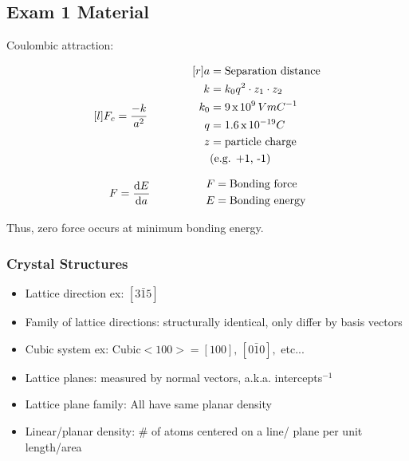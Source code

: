 \documentclass{equation-sheet}
\begin{document}
\subsection{Exam 1 Material}

Coulombic attraction:

\begin{equation*}
	\begin{aligned}[l]
		F_c &= \frac{-k}{a^2} \\
	\end{aligned} 
	\qquad \qquad
	\begin{aligned}[r]
	    a &= \text{Separation distance} \\
		k &= k_0 q^2 \cdot z_1 \cdot z_2 \\
		k_0 &= \scinote{9}{9} \, V m C^{-1} \\
		q &= \scinote{1.6}{-19} C \\
		z &= \text{particle charge} \\
		& \text{(e.g. +1, -1)}
	\end{aligned}
\end{equation*}

\begin{equation*}
    \begin{aligned}
        F &= \dfrac{\mathrm{d}E}{\mathrm{d}a}
    \end{aligned}
    \qquad \qquad
    \begin{aligned}
        F &= \text{Bonding force} \\
        E &= \text{Bonding energy}
    \end{aligned}
\end{equation*}

Thus, zero force occurs at minimum bonding energy.

\sepspace

\secbreak

\subsubsection{Crystal Structures}

\begin{itemize}
    \item Lattice direction ex: $[3 \bar 1 5]$
    \item Family of lattice directions: structurally identical, only differ by basis vectors
    \item Cubic system ex: Cubic$<100>=[100],\, [0 \bar 1 0],$ etc...
    \item Lattice planes: measured by normal vectors, a.k.a. intercepts$^{-1}$
    \item Lattice plane family: All have same planar density
    \item Linear/planar density: \# of atoms centered on a line/ plane per unit length/area
\end{itemize}
\end{document}
